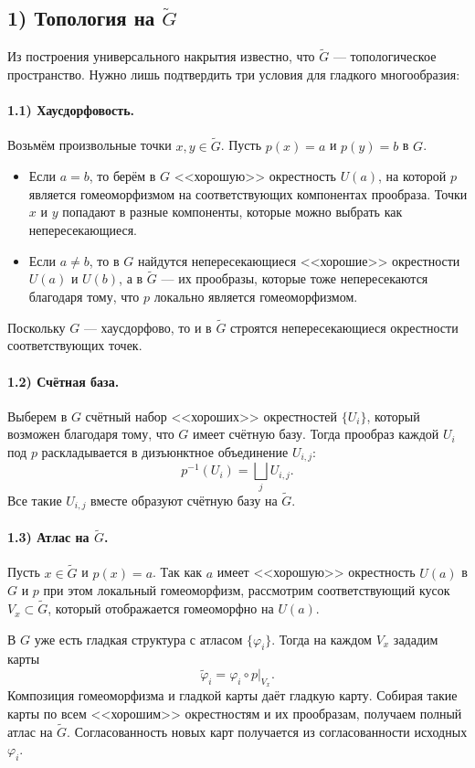 \documentclass{article}
\begin{document}
\subsection*{1) Топология на $\widetilde{G}$}
Из построения универсального накрытия известно, что $\widetilde{G}$ --- топологическое пространство. Нужно лишь подтвердить три условия для гладкого многообразия:

\paragraph{1.1) Хаусдорфовость.}
Возьмём произвольные точки $x,y \in \widetilde{G}$. Пусть $p(x)=a$ и $p(y)=b$ в $G$.
\begin{itemize}
\item Если $a=b$, то берём в $G$ <<хорошую>> окрестность $U(a)$, на которой $p$ является гомеоморфизмом на соответствующих компонентах прообраза. Точки $x$ и $y$ попадают в разные компоненты, которые можно выбрать как непересекающиеся.
\item Если $a \neq b$, то в $G$ найдутся непересекающиеся <<хорошие>> окрестности $U(a)$ и $U(b)$, а в $\widetilde{G}$ --- их прообразы, которые тоже непересекаются благодаря тому, что $p$ локально является гомеоморфизмом.
\end{itemize}
Поскольку $G$ --- хаусдорфово, то и в $\widetilde{G}$ строятся непересекающиеся окрестности соответствующих точек.

\paragraph{1.2) Счётная база.}
Выберем в $G$ счётный набор <<хороших>> окрестностей $\{U_i\}$, который возможен благодаря тому, что $G$ имеет счётную базу. Тогда прообраз каждой $U_i$ под $p$ раскладывается в дизъюнктное объединение $U_{i,j}$:
\[
p^{-1}(U_i) = \bigsqcup_j U_{i,j}.
\]
Все такие $U_{i,j}$ вместе образуют счётную базу на $\widetilde{G}$.

\paragraph{1.3) Атлас на $\widetilde{G}$.}
Пусть $x \in \widetilde{G}$ и $p(x)=a$. Так как $a$ имеет <<хорошую>> окрестность $U(a)$ в $G$ и $p$ при этом локальный гомеоморфизм, рассмотрим соответствующий кусок $V_x \subset \widetilde{G}$, который отображается гомеоморфно на $U(a)$.

В $G$ уже есть гладкая структура с атласом $\{\varphi_i\}$. Тогда на каждом $V_x$ зададим карты
\[
\widetilde{\varphi}_i = \varphi_i \circ p \bigl|_{V_x}.
\]
Композиция гомеоморфизма и гладкой карты даёт гладкую карту. Собирая такие карты по всем <<хорошим>> окрестностям и их прообразам, получаем полный атлас на $\widetilde{G}$. Согласованность новых карт получается из согласованности исходных $\varphi_i$.
\end{document}
